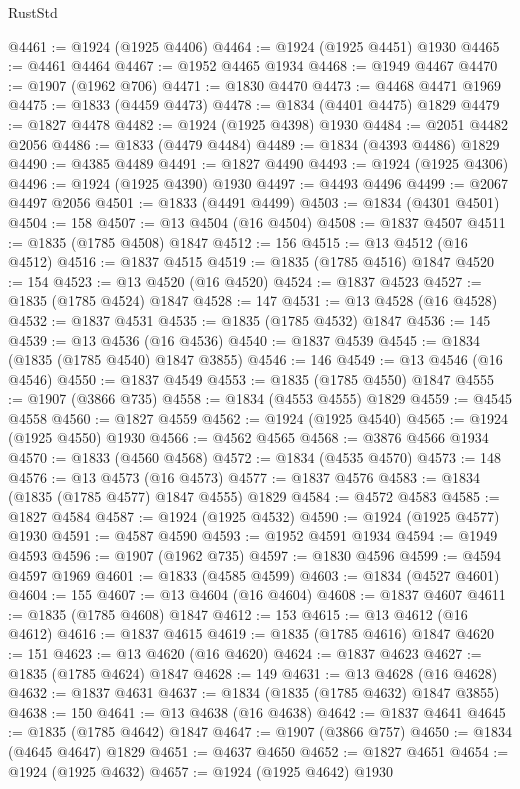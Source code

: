 \begin{lexlean}{RustStd}
\begin{coremodule}
@4461 := @1924 (@1925 @4406)
@4464 := @1924 (@1925 @4451) @1930
@4465 := @4461 @4464
@4467 := @1952 @4465 @1934
@4468 := @1949 @4467
@4470 := @1907 (@1962 @706)
@4471 := @1830 @4470
@4473 := @4468 @4471 @1969
@4475 := @1833 (@4459 @4473)
@4478 := @1834 (@4401 @4475) @1829
@4479 := @1827 @4478
@4482 := @1924 (@1925 @4398) @1930
@4484 := @2051 @4482 @2056
@4486 := @1833 (@4479 @4484)
@4489 := @1834 (@4393 @4486) @1829
@4490 := @4385 @4489
@4491 := @1827 @4490
@4493 := @1924 (@1925 @4306)
@4496 := @1924 (@1925 @4390) @1930
@4497 := @4493 @4496
@4499 := @2067 @4497 @2056
@4501 := @1833 (@4491 @4499)
@4503 := @1834 (@4301 @4501)
@4504 := 158
@4507 := @13 @4504 (@16 @4504)
@4508 := @1837 @4507
@4511 := @1835 (@1785 @4508) @1847
@4512 := 156
@4515 := @13 @4512 (@16 @4512)
@4516 := @1837 @4515
@4519 := @1835 (@1785 @4516) @1847
@4520 := 154
@4523 := @13 @4520 (@16 @4520)
@4524 := @1837 @4523
@4527 := @1835 (@1785 @4524) @1847
@4528 := 147
@4531 := @13 @4528 (@16 @4528)
@4532 := @1837 @4531
@4535 := @1835 (@1785 @4532) @1847
@4536 := 145
@4539 := @13 @4536 (@16 @4536)
@4540 := @1837 @4539
@4545 := @1834 (@1835 (@1785 @4540) @1847 @3855)
@4546 := 146
@4549 := @13 @4546 (@16 @4546)
@4550 := @1837 @4549
@4553 := @1835 (@1785 @4550) @1847
@4555 := @1907 (@3866 @735)
@4558 := @1834 (@4553 @4555) @1829
@4559 := @4545 @4558
@4560 := @1827 @4559
@4562 := @1924 (@1925 @4540)
@4565 := @1924 (@1925 @4550) @1930
@4566 := @4562 @4565
@4568 := @3876 @4566 @1934
@4570 := @1833 (@4560 @4568)
@4572 := @1834 (@4535 @4570)
@4573 := 148
@4576 := @13 @4573 (@16 @4573)
@4577 := @1837 @4576
@4583 := @1834 (@1835 (@1785 @4577) @1847 @4555) @1829
@4584 := @4572 @4583
@4585 := @1827 @4584
@4587 := @1924 (@1925 @4532)
@4590 := @1924 (@1925 @4577) @1930
@4591 := @4587 @4590
@4593 := @1952 @4591 @1934
@4594 := @1949 @4593
@4596 := @1907 (@1962 @735)
@4597 := @1830 @4596
@4599 := @4594 @4597 @1969
@4601 := @1833 (@4585 @4599)
@4603 := @1834 (@4527 @4601)
@4604 := 155
@4607 := @13 @4604 (@16 @4604)
@4608 := @1837 @4607
@4611 := @1835 (@1785 @4608) @1847
@4612 := 153
@4615 := @13 @4612 (@16 @4612)
@4616 := @1837 @4615
@4619 := @1835 (@1785 @4616) @1847
@4620 := 151
@4623 := @13 @4620 (@16 @4620)
@4624 := @1837 @4623
@4627 := @1835 (@1785 @4624) @1847
@4628 := 149
@4631 := @13 @4628 (@16 @4628)
@4632 := @1837 @4631
@4637 := @1834 (@1835 (@1785 @4632) @1847 @3855)
@4638 := 150
@4641 := @13 @4638 (@16 @4638)
@4642 := @1837 @4641
@4645 := @1835 (@1785 @4642) @1847
@4647 := @1907 (@3866 @757)
@4650 := @1834 (@4645 @4647) @1829
@4651 := @4637 @4650
@4652 := @1827 @4651
@4654 := @1924 (@1925 @4632)
@4657 := @1924 (@1925 @4642) @1930

\end{coremodule}
\end{lexlean}
